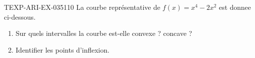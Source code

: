 \begin{exercice}{TEXP-ARI-EX-035}{1}{10}
La courbe représentative de $f(x) = x^4 - 2x^2$ est donnee ci-dessous.
\begin{enumerate}
  \item Sur quels intervalles la courbe est-elle convexe ? concave ?
  \item Identifier les points d'inflexion.
\end{enumerate}

\end{exercice}
